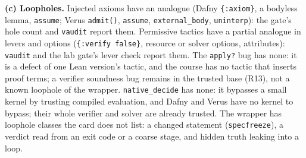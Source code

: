 \documentclass[11pt]{article}
\begin{document}
\begin{answer}
\textbf{(c) Loopholes.} Injected axioms have an analogue (Dafny
\texttt{\{:axiom\}}, a bodyless lemma, \texttt{assume}; Verus
\texttt{admit()}, \texttt{assume}, \texttt{external\_body}, \texttt{uninterp}):
the gate's hole count and \texttt{vaudit} report them. Permissive tactics have
a partial analogue in levers and options (\texttt{\{:verify false\}}, resource
or solver options, attributes): \texttt{vaudit} and the lab gate's lever check
report them. The \texttt{apply?} bug has none: it is a defect of one Lean
version's tactic, and the course has no tactic that inserts proof terms; a
verifier soundness bug remains in the trusted base (R13), not a known
loophole of the wrapper. \texttt{native\_decide} has none: it bypasses a small
kernel by trusting compiled evaluation, and Dafny and Verus have no kernel to
bypass; their whole verifier and solver are already trusted. The wrapper has
loophole classes the card does not list: a changed statement
(\texttt{specfreeze}), a verdict read from an exit code or a coarse stage, and
hidden truth leaking into a loop.
\end{answer}
\end{document}
